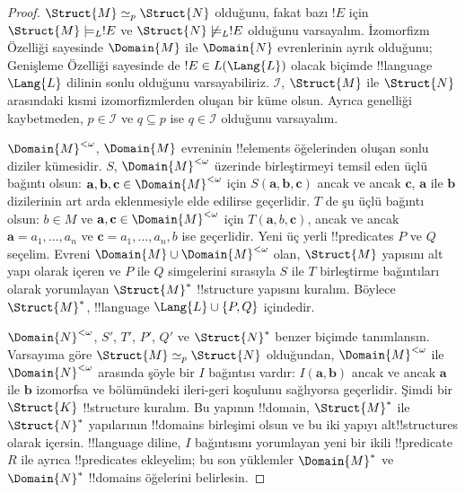 \begin{proof}
$\Struct{M}\simeq_p\Struct{N}$ olduğunu, fakat bazı $!E$ için
$\Struct{M}\models_L !E$ ve $\Struct{N}\not\models_L !E$ olduğunu varsayalım.
İzomorfizm Özelliği sayesinde $\Domain{M}$ ile $\Domain{N}$ evrenlerinin
ayrık olduğunu; Genişleme Özelliği sayesinde de $!E\in L(\Lang{L})$ olacak
biçimde !!{language}~$\Lang{L}$ dilinin sonlu olduğunu varsayabiliriz.
$\mathcal I$, $\Struct{M}$ ile $\Struct{N}$ arasındaki kısmi izomorfizmlerden
oluşan bir küme olsun. Ayrıca genelliği kaybetmeden, $p\in\mathcal I$ ve
$q\subseteq p$ ise $q\in\mathcal I$ olduğunu varsayalım.

$\Domain{M}^{<\omega}$, $\Domain{M}$ evreninin !!{element}s öğelerinden oluşan
sonlu diziler kümesidir. $S$, $\Domain{M}^{<\omega}$ üzerinde birleştirmeyi
temsil eden üçlü bağıntı olsun: $\mathbf a,\mathbf b,\mathbf c\in
\Domain{M}^{<\omega}$ için $S(\mathbf a,\mathbf b,\mathbf c)$ ancak ve ancak
$\mathbf c$, $\mathbf a$ ile $\mathbf b$ dizilerinin art arda eklenmesiyle
elde edilirse geçerlidir. $T$ de şu üçlü bağıntı olsun: $b\in M$ ve
$\mathbf a,\mathbf c\in\Domain{M}^{<\omega}$ için
$T(\mathbf a,b,\mathbf c)$, ancak ve ancak
$\mathbf a=a_1,\dots,a_n$ ve $\mathbf c=a_1,\dots,a_n,b$ ise geçerlidir.
Yeni üç yerli !!{predicate}s $P$ ve $Q$ seçelim. Evreni
$\Domain{M}\cup\Domain{M}^{<\omega}$ olan, $\Struct{M}$ yapısını alt yapı
olarak içeren ve $P$ ile $Q$ simgelerini sırasıyla $S$ ile $T$ birleştirme
bağıntıları olarak yorumlayan $\Struct{M}^*$ !!{structure} yapısını kuralım.
Böylece $\Struct{M}^*$, !!{language} $\Lang{L}\cup\{P,Q\}$ içindedir.

$\Domain{N}^{<\omega}$, $S'$, $T'$, $P'$, $Q'$ ve $\Struct{N}^*$ benzer
biçimde tanımlansın. Varsayıma göre $\Struct{M}\simeq_p\Struct{N}$ olduğundan,
$\Domain{M}^{<\omega}$ ile $\Domain{N}^{<\omega}$ arasında şöyle bir $I$
bağıntısı vardır: $I(\mathbf a,\mathbf b)$ ancak ve ancak $\mathbf a$ ile
$\mathbf b$ izomorfsa ve  bölümündeki
ileri-geri koşulunu sağlıyorsa geçerlidir. Şimdi bir $\Struct{K}$
!!{structure} kuralım. Bu yapının !!{domain}, $\Struct{M}^*$ ile
$\Struct{N}^*$ yapılarının !!{domain}s birleşimi olsun ve bu iki yapıyı
alt!!{structure}s olarak içersin. !!{language} diline, $I$ bağıntısını
yorumlayan yeni bir ikili !!{predicate}~$R$ ile ayrıca !!{predicate}s
ekleyelim; bu son yüklemler $\Domain{M}^*$ ve $\Domain{N}^*$ !!{domain}s
öğelerini belirlesin.


\end{proof}
